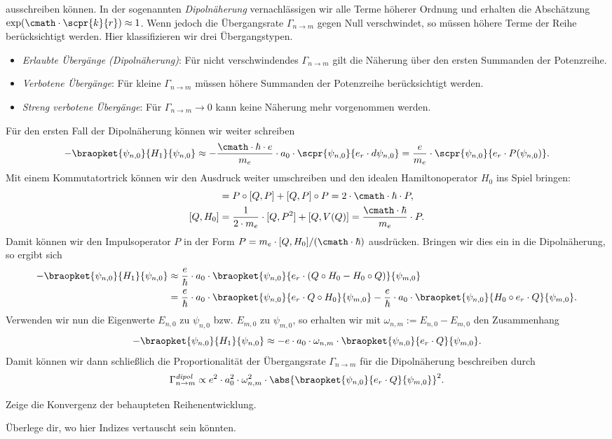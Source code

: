 \documentclass{subfile}
\begin{document}
        ausschreiben können. In der sogenannten \emph{Dipolnäherung} vernachlässigen wir alle Terme höherer Ordnung und erhalten die Abschätzung $\exp(\cmath\cdot\scpr{k}{r})\approx 1$. Wenn jedoch die Übergangsrate $\Gamma_{n\to m}$ gegen Null verschwindet, so müssen höhere Terme der Reihe berücksichtigt werden. Hier klassifizieren wir drei Übergangstypen.
        \begin{itemize}[label=$\to$]
            \item \emph{Erlaubte Übergänge (Dipolnäherung)}: Für nicht verschwindendes $\Gamma_{n\to m}$ gilt die Näherung über den ersten Summanden der Potenzreihe.
            \item \emph{Verbotene Übergänge}: Für kleine $\Gamma_{n\to m}$ müssen höhere Summanden der Potenzreihe berücksichtigt werden.
            \item \emph{Streng verbotene Übergänge}: Für $\Gamma_{n\to m} \to 0$ kann keine Näherung mehr vorgenommen werden. 
        \end{itemize}
        Für den ersten Fall der Dipolnäherung können wir weiter schreiben
        \[
            -\braopket{\psi_{n,0}}{H_1}{\psi_{n,0}} \approx -\frac{\cmath\cdot\hbar\cdot e}{m_e}\cdot a_0\cdot\scpr{\psi_{n,0}}{e_r\cdot d\psi_{n,0}} = \frac{e}{m_e}\cdot\scpr{\psi_{n,0}}{e_r\cdot P(\psi_{n,0})}.
        \]
        Mit einem Kommutatortrick können wir den Ausdruck weiter umschreiben und den idealen Hamiltonoperator $H_0$ ins Spiel bringen:
        \begin{align*}
            [Q,P^2] &= P\circ[Q,P] + [Q,P]\circ P = 2\cdot\cmath\cdot\hbar\cdot P, \\
            [Q,H_0] &= \frac{1}{2\cdot m_e}\cdot [Q,P^2] + [Q,V(Q)] = \frac{\cmath\cdot\hbar}{m_e}\cdot P.
        \end{align*}
        Damit können wir den Impulsoperator $P$ in der Form $P = m_e\cdot[Q,H_0]/(\cmath\cdot\hbar)$ ausdrücken. Bringen wir dies ein in die Dipolnäherung, so ergibt sich
        \begin{align*}
            -\braopket{\psi_{n,0}}{H_1}{\psi_{n,0}} &\approx \frac{e}{\hbar}\cdot a_0\cdot\braopket{\psi_{n,0}}{e_r\cdot (Q\circ H_0 - H_0\circ Q)}{\psi_{m,0}} \\ 
            &= \frac{e}{\hbar}\cdot a_0\cdot\braopket{\psi_{n,0}}{e_r\cdot Q\circ H_0}{\psi_{m,0}} - \frac{e}{\hbar}\cdot a_0\cdot\braopket{\psi_{n,0}}{H_0\circ e_r\cdot Q}{\psi_{m,0}}.
        \end{align*}
        Verwenden wir nun die Eigenwerte $E_{n,0}$ zu $\psi_{n,0}$ bzw. $E_{m,0}$ zu $\psi_{m,0}$, so erhalten wir mit $\omega_{n,m}:=E_{n,0} - E_{m,0}$ den Zusammenhang
        \[
            -\braopket{\psi_{n,0}}{H_1}{\psi_{n,0}} \approx -e\cdot a_0\cdot\omega_{n,m}\cdot\braopket{\psi_{n,0}}{e_r\cdot Q}{\psi_{m,0}}.
        \]
        Damit können wir dann schließlich die Proportionalität der Übergangsrate $\Gamma_{n\to m}$ für die Dipolnäherung beschreiben durch
        \[
            \Gamma_{n\to m}^\textit{dipol} \propto e^2\cdot a_0^2\cdot\omega_{n,m}^2\cdot\abs{\braopket{\psi_{n,0}}{e_r\cdot Q}{\psi_{m,0}}}^2.
        \]
        
        \begin{Aufgabe}
            \nr{} Zeige die Konvergenz der behaupteten Reihenentwicklung. 

            \nr{} Überlege dir, wo hier Indizes vertauscht sein könnten. 
        \end{Aufgabe}
\end{document}
